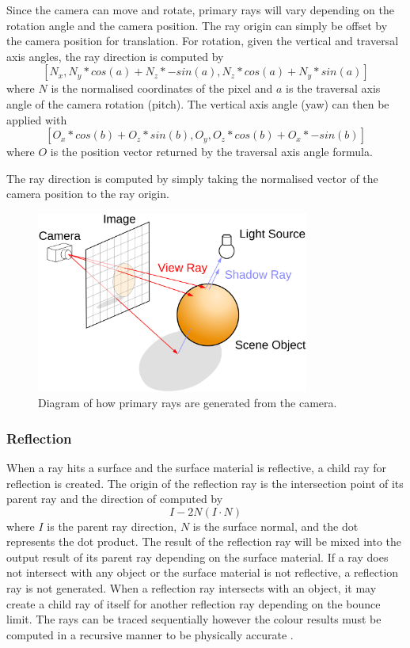 \documentclass[final]{cmpreport}
\begin{document}
Since the camera can move and rotate, primary rays will vary depending on the rotation angle and the camera position. The ray origin can simply be offset by the camera position for translation. For rotation, given the vertical and traversal axis angles, the ray direction is computed by 
$$[ N_x, N_y * cos(a) + N_z * -sin(a), N_z * cos(a) + N_y * sin(a) ]$$ where $N$ is the normalised coordinates of the pixel and $a$ is the traversal axis angle of the camera rotation (pitch). The vertical axis angle (yaw) can then be applied with $$[ O_x * cos(b) + O_z * sin(b), O_y, O_z * cos(b) + O_x * -sin(b) ]$$ where $O$ is the position vector returned by the traversal axis angle formula.

The ray direction is computed by simply taking the normalised vector of the camera position to the ray origin.

\begin{figure}
    \centering
    \includegraphics[width=0.8\textwidth]{img/backward_ray_tracing.png}
    \caption{Diagram of how primary rays are generated from the camera. \citep{henrikdia}}
\end{figure}

\subsubsection{Reflection}

When a ray hits a surface and the surface material is reflective, a child ray for reflection is created. The origin of the reflection ray is the intersection point of its parent ray and the direction of computed by $$I - 2N(I \cdot N)$$ where $I$ is the parent ray direction, $N$ is the surface normal, and the dot represents the dot product. The result of the reflection ray will be mixed into the output result of its parent ray depending on the surface material. If a ray does not intersect with any object or the surface material is not reflective, a reflection ray is not generated. When a reflection ray intersects with an object, it may create a child ray of itself for another reflection ray depending on the bounce limit. The rays can be traced sequentially however the colour results must be computed in a recursive manner to be physically accurate \citep{de2006reflections}.
\end{document}
